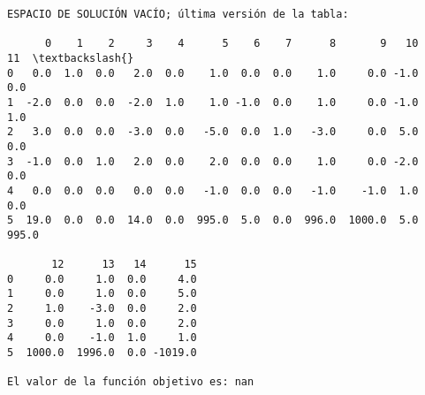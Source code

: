 \begin{Verbatim}[commandchars=\\\{\}]
ESPACIO DE SOLUCIÓN VACÍO; última versión de la tabla:

      0    1    2     3    4      5    6    7      8       9   10     11  \textbackslash{}
0   0.0  1.0  0.0   2.0  0.0    1.0  0.0  0.0    1.0     0.0 -1.0    0.0   
1  -2.0  0.0  0.0  -2.0  1.0    1.0 -1.0  0.0    1.0     0.0 -1.0    1.0   
2   3.0  0.0  0.0  -3.0  0.0   -5.0  0.0  1.0   -3.0     0.0  5.0    0.0   
3  -1.0  0.0  1.0   2.0  0.0    2.0  0.0  0.0    1.0     0.0 -2.0    0.0   
4   0.0  0.0  0.0   0.0  0.0   -1.0  0.0  0.0   -1.0    -1.0  1.0    0.0   
5  19.0  0.0  0.0  14.0  0.0  995.0  5.0  0.0  996.0  1000.0  5.0  995.0   

       12      13   14      15  
0     0.0     1.0  0.0     4.0  
1     0.0     1.0  0.0     5.0  
2     1.0    -3.0  0.0     2.0  
3     0.0     1.0  0.0     2.0  
4     0.0    -1.0  1.0     1.0  
5  1000.0  1996.0  0.0 -1019.0  

El valor de la función objetivo es: nan
\end{Verbatim}
